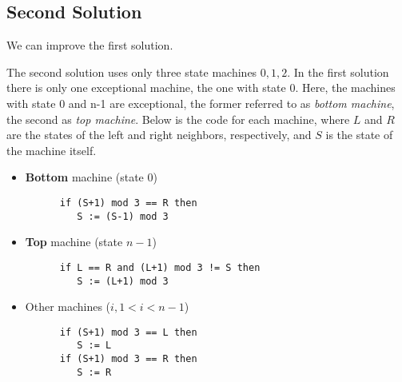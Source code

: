 
\subsection{Second Solution}
We can improve the first solution.

The second solution uses only three state machines ${0,1,2}$.
In the first solution there is only one exceptional machine, the one with state 0.
Here, the machines with state 0 and n-1 are exceptional, the former referred to as \textit{bottom machine}, the second as \textit{top machine}.
Below is the code for each machine, where $L$ and $R$ are the states of the left and right neighbors, respectively, and $S$ is the state of the machine itself.
\begin{itemize}
   \item \textbf{Bottom} machine (state $0$)
   \begin{lstlisting}
      if (S+1) mod 3 == R then
         S := (S-1) mod 3 
   \end{lstlisting}
   \item \textbf{Top} machine (state $n-1$)
   \begin{lstlisting}
      if L == R and (L+1) mod 3 != S then
         S := (L+1) mod 3 
   \end{lstlisting}
   \item Other machines ($i, 1 < i < n-1$)
   \begin{lstlisting}
      if (S+1) mod 3 == L then
         S := L
      if (S+1) mod 3 == R then
         S := R
   \end{lstlisting}
\end{itemize}

